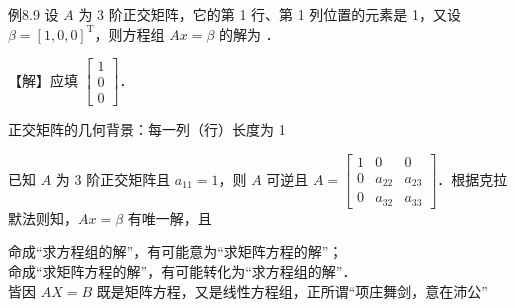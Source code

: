 \begin{fcard}{例8.9}
设 $A$ 为 3 阶正交矩阵，它的第 1 行、第 1 列位置的元素是 1，又设 $\beta=[1,0,0]^{\mathrm T}$，则方程组 $Ax=\beta$ 的解为 \underline{\hspace{4em}}．

【解】应填 $\begin{bmatrix}1\\0\\0\end{bmatrix}$．

\begin{fnote}
正交矩阵的几何背景：每一列（行）长度为 1
\end{fnote}

已知 $A$ 为 3 阶正交矩阵且 $a_{11}=1$，则 $A$ 可逆且 $A=\begin{bmatrix}1&0&0\\0&a_{22}&a_{23}\\0&a_{32}&a_{33}\end{bmatrix}$．根据克拉默法则知，$Ax=\beta$ 有唯一解，且

\end{fcard}

\begin{fnote}
命成“求方程组的解”，有可能意为“求矩阵方程的解”；\\
命成“求矩阵方程的解”，有可能转化为“求方程组的解”．\\
皆因 $AX=B$ 既是矩阵方程，又是线性方程组，正所谓“项庄舞剑，意在沛公”
\end{fnote}



